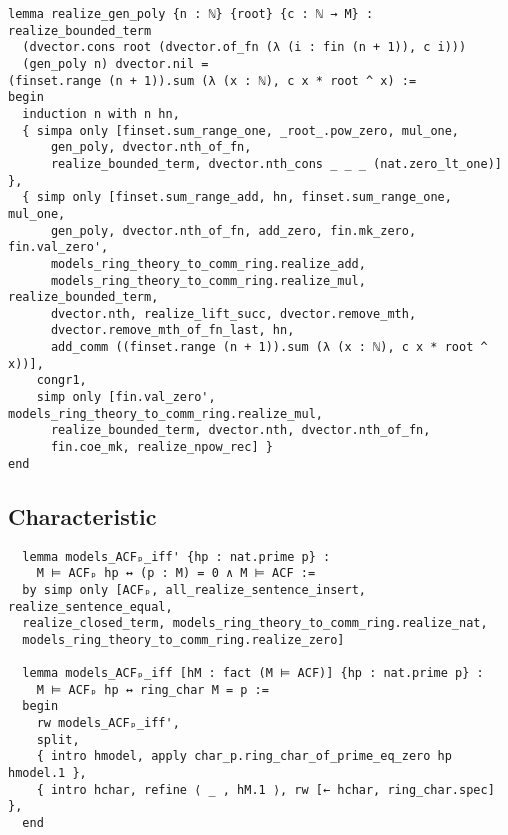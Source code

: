 \begin{lstlisting}
lemma realize_gen_poly {n : ℕ} {root} {c : ℕ → M} :
realize_bounded_term
  (dvector.cons root (dvector.of_fn (λ (i : fin (n + 1)), c i)))
  (gen_poly n) dvector.nil =
(finset.range (n + 1)).sum (λ (x : ℕ), c x * root ^ x) :=
begin
  induction n with n hn,
  { simpa only [finset.sum_range_one, _root_.pow_zero, mul_one,
      gen_poly, dvector.nth_of_fn,
      realize_bounded_term, dvector.nth_cons _ _ _ (nat.zero_lt_one)] },
  { simp only [finset.sum_range_add, hn, finset.sum_range_one, mul_one,
      gen_poly, dvector.nth_of_fn, add_zero, fin.mk_zero, fin.val_zero',
      models_ring_theory_to_comm_ring.realize_add,
      models_ring_theory_to_comm_ring.realize_mul, realize_bounded_term,
      dvector.nth, realize_lift_succ, dvector.remove_mth,
      dvector.remove_mth_of_fn_last, hn,
      add_comm ((finset.range (n + 1)).sum (λ (x : ℕ), c x * root ^ x))],
    congr1,
    simp only [fin.val_zero', models_ring_theory_to_comm_ring.realize_mul,
      realize_bounded_term, dvector.nth, dvector.nth_of_fn,
      fin.coe_mk, realize_npow_rec] }
end\end{lstlisting}

\subsection{Characteristic}


\begin{lstlisting}
  lemma models_ACFₚ_iff' {hp : nat.prime p} :
    M ⊨ ACFₚ hp ↔ (p : M) = 0 ∧ M ⊨ ACF :=
  by simp only [ACFₚ, all_realize_sentence_insert, realize_sentence_equal,
  realize_closed_term, models_ring_theory_to_comm_ring.realize_nat,
  models_ring_theory_to_comm_ring.realize_zero]

  lemma models_ACFₚ_iff [hM : fact (M ⊨ ACF)] {hp : nat.prime p} :
    M ⊨ ACFₚ hp ↔ ring_char M = p :=
  begin
    rw models_ACFₚ_iff',
    split,
    { intro hmodel, apply char_p.ring_char_of_prime_eq_zero hp hmodel.1 },
    { intro hchar, refine ⟨ _ , hM.1 ⟩, rw [← hchar, ring_char.spec] },
  end
\end{lstlisting}

